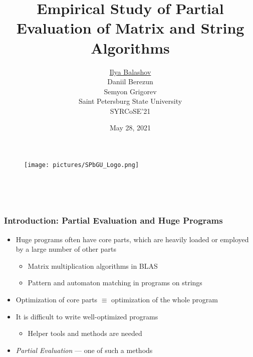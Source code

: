 \documentclass{beamer}
\title[Empirical Partial Evaluation Experiments]{Empirical Study of Partial Evaluation of Matrix and String Algorithms}
\subtitle[]{}
\institute[SPbU]{
}
\author[Ilya Balashov, et al.]{\underline{Ilya Balashov}\\ Daniil Berezun \\ Semyon Grigorev \\
  \bigskip
	Saint Petersburg State University \bigskip \\ SYRCoSE'21
}
\date{\vspace{-1cm} May 28, 2021}
\begin{document}
{
\begin{frame}
\vspace{10pt}
\begin{figure}
	
	\begin{minipage}{1.0\textwidth}
		\centering
		\texttt{[image: pictures/SPbGU\_Logo.png]}
	\end{minipage}
\end{figure}
\vspace{-7pt}
\hspace{-10pt}
\begin{center}
   \begin{tabular}{c}
    \end{tabular}
\titlepage
\vspace{-15pt}
{\scriptsize
 {
 \begin{tabular} {p{1.5cm} r l} 
 
 \end{tabular}
 }}
  \\
  \vspace{32pt}

  \end{center}

\end{frame}
}
            

\begin{frame}
	\transwipe[direction=90]
	\frametitle{Introduction: Partial Evaluation and Huge Programs}
	\begin{itemize}
		\item Huge programs often have core parts, which are heavily loaded or employed by a large number of other parts
		\begin{itemize}
			\item Matrix multiplication algorithms in BLAS
			\item Pattern and automaton matching in programs on strings
		\end{itemize} \vfill
		\item Optimization of core parts $\equiv$ optimization of the whole program \vfill
		\item It is difficult to write well-optimized programs
		\begin{itemize}
			\item Helper tools and methods are needed
		\end{itemize}\vfill
	
	
		\item \textit{Partial Evaluation} --- one of such a methods\vfill
	\end{itemize}
	
	
\end{frame}
\end{document}
